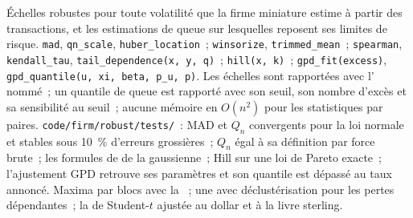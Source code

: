 \begin{build}
 Échelles robustes pour toute volatilité que la firme miniature estime à partir des transactions, et les estimations de queue sur lesquelles reposent ses limites de risque.
 \texttt{mad}, \texttt{qn\_scale}, \texttt{huber\_location}~; \texttt{winsorize}, \texttt{trimmed\_mean}~; \texttt{spearman},
\texttt{kendall\_tau}, \texttt{tail\_dependence(x, y, q)}~; \texttt{hill(x, k)}~; \texttt{gpd\_fit(excess)}, \texttt{gpd\_quantile(u, xi, beta,
p\_u, p)}.
 Les échelles sont rapportées avec l' nommé~; un quantile de queue est rapporté avec son seuil, son nombre d'excès et sa
sensibilité au seuil~; aucune mémoire en $O(n^2)$ pour les statistiques par paires.
 \texttt{code/firm/robust/tests/}~: MAD et $Q_n$ convergents pour la loi normale et stables sous 10~\% d'erreurs grossières~; $Q_n$ égal
à sa définition par force brute~; les formules de  de la  gaussienne~; Hill sur une loi de Pareto exacte~; l'ajustement GPD retrouve ses
paramètres et son quantile est dépassé au taux annoncé.
 Maxima par blocs avec la ~; une  avec déclustérisation pour les pertes dépendantes~; la  de Student-$t$ ajustée au
dollar et à la livre sterling.
\end{build}

